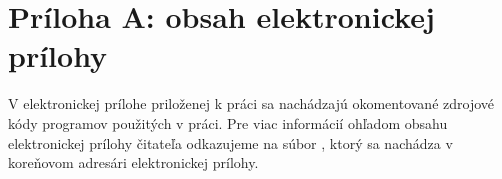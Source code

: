 \chapter*{Príloha A: obsah elektronickej prílohy}

V elektronickej prílohe priloženej k práci sa nachádzajú okomentované zdrojové kódy programov použitých v práci. Pre viac informácií ohľadom obsahu elektronickej prílohy čitateľa odkazujeme na súbor , ktorý sa nachádza v koreňovom adresári elektronickej prílohy.